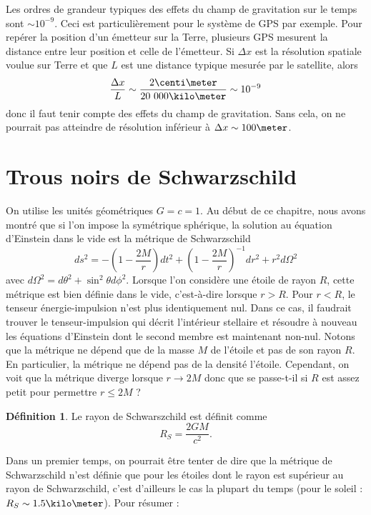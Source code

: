 \documentclass[a4paper,11pt]{report}
\theoremstyle{definition}
\theoremstyle{plain}
\theoremstyle{definition}
\newtheorem{defn}{Définition}[chapter]
\theoremstyle{remark}
\begin{document}
        Les ordres de grandeur typiques des effets du champ de gravitation sur le temps sont $\sim10^{-9}$. Ceci est particulièrement pour le système de GPS par exemple. Pour repérer la position d'un émetteur sur la Terre, plusieurs GPS mesurent la distance entre leur position et celle de l'émetteur. Si $\Delta x$ est la résolution spatiale voulue sur Terre et que $L$ est une distance typique mesurée par le satellite, alors
        \begin{equation}
            \frac{\Delta x}{L}\sim\frac{2\centi\meter}{20~000\kilo\meter}\sim10^{-9}
        \end{equation}
        donc il faut tenir compte des effets du champ de gravitation. Sans cela, on ne pourrait pas atteindre de résolution inférieur à $\Delta x\sim100\meter$.
        
    \section{Trous noirs de Schwarzschild}
    
        On utilise les unités géométriques $G = c = 1$. Au début de ce chapitre, nous avons montré que si l'on impose la symétrique sphérique, la solution au équation d'Einstein dans le vide est la métrique de Schwarzschild
        \begin{equation}
            ds^2 = -\left( 1-\frac{2M}{r} \right)dt^2 + \left( 1-\frac{2M}{r} \right)^{-1}dr^2 + r^2d\Omega^2
        \end{equation}
        avec $d\Omega^2 = d\theta^2+\sin^2\theta d\phi^2$. Lorsque l'on considère une étoile de rayon $R$, cette métrique est bien définie dans le vide, c'est-à-dire lorsque $r>R$. Pour $r<R$, le tenseur énergie-impulsion n'est plus identiquement nul. Dans ce cas, il faudrait trouver le tenseur-impulsion qui décrit l'intérieur stellaire et résoudre à nouveau les équations d'Einstein dont le second membre est maintenant non-nul. Notons que la métrique ne dépend que de la masse $M$ de l'étoile et pas de son rayon $R$. En particulier, la métrique ne dépend pas de la densité l'étoile. Cependant, on voit que la métrique diverge lorsque $r\to2M$ donc que se passe-t-il si $R$ est assez petit pour permettre $r\leq2M$ ? 
        \begin{defn}
            Le rayon de Schwarszchild est définit comme  
            \begin{equation}
                R_S =\frac{2GM}{c^2}.
            \end{equation}
        \end{defn}
        Dans un premier temps, on pourrait être tenter de dire que la métrique de Schwarzschild n'est définie que pour les étoiles dont le rayon est supérieur au rayon de Schwarzschild, c'est d'ailleurs le cas la plupart du temps (pour le soleil : $R_S\sim 1.5\kilo\meter$). Pour résumer :
        
\end{document}
